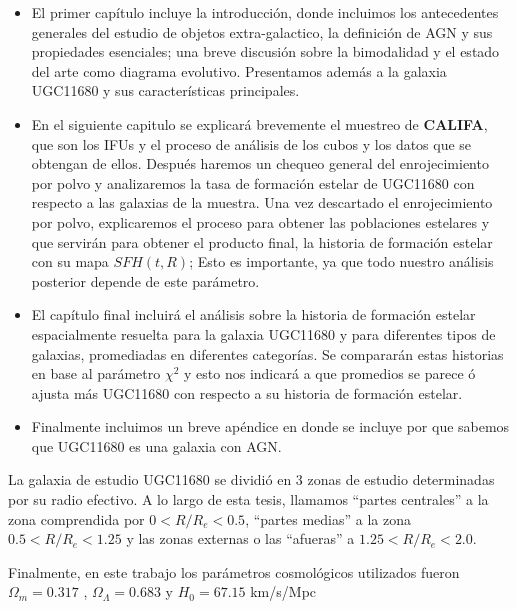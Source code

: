 \begin{itemize}

\item El primer capítulo incluye la introducción, donde incluimos los antecedentes generales del estudio de objetos extra-galactico, la definición de AGN y sus propiedades esenciales; una breve discusión sobre la bimodalidad y el estado del arte como diagrama evolutivo. Presentamos además a la galaxia UGC11680 y sus características principales.


\item En el siguiente capitulo se explicará brevemente el muestreo de \textbf{CALIFA}, que son los IFUs y el proceso de análisis de los cubos y los datos que se obtengan de ellos. Después haremos un chequeo general del enrojecimiento  por polvo y analizaremos la tasa de formación estelar de UGC11680 con respecto a las galaxias de la muestra. Una vez descartado el enrojecimiento por polvo, explicaremos el proceso para obtener las poblaciones estelares y que servirán para obtener el producto final, la historia de formación estelar con su mapa $SFH(t,R)$; Esto es importante, ya que todo nuestro análisis posterior depende de este parámetro.

\item El capítulo final incluirá el análisis sobre la historia de formación estelar espacialmente resuelta para la galaxia UGC11680 y para diferentes tipos de galaxias, promediadas en diferentes categorías. Se compararán estas historias en base al parámetro  $\chi^2$ y esto nos indicará a que promedios se parece ó ajusta más UGC11680 con respecto a su historia de formación estelar.

\item Finalmente incluimos un breve apéndice en donde se incluye por que sabemos que UGC11680 es una galaxia con AGN.

\end{itemize}

\noindent La galaxia de estudio UGC11680 se dividió en 3 zonas de estudio determinadas por su radio efectivo. A lo largo de esta tesis, llamamos ``partes centrales'' a la zona comprendida por $0< R/R_e < 0.5$, ``partes medias'' a la zona $ 0.5< R/R_e < 1.25 $ y las zonas externas o las ``afueras'' a $1.25<R/R_e < 2.0$.

\bigskip

\noindent Finalmente, en este trabajo los parámetros cosmológicos utilizados fueron $\Omega_m = 0.317$ , $\Omega_{\Lambda}=0.683$ y $H_0 = 67.15$ km/s/Mpc \citep{plank2014}

